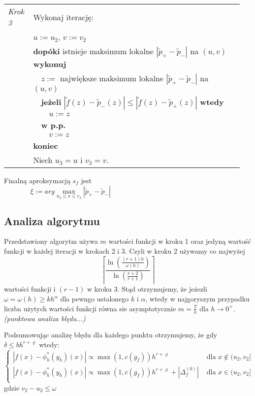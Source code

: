 \documentclass[oik, pdftex, robocza, man]{mgrwms}
\begin{document}
\begin{tabular}{p{0.10\linewidth} p{0.85\linewidth}}
    \textit{Krok 3} & Wykonaj iterację: \\
                    & $u := u_2$, $v := v_2$ \\
                    & \textbf{dopóki} istnieje maksimum lokalne $|\tilde{p}_{+} - \tilde{p}_{-}|$ na $(u,v)$ \textbf{wykonuj} \\
                    & $\quad$$z :=$ największe maksimum lokalne $|\tilde{p}_{+} - \tilde{p}_{-}|$ na $(u,v)$ \\
                    & $\quad$\textbf{jeżeli} $|\tilde{f}(z) - \tilde{p}_{-}(z)| \leq |\tilde{f}(z) - \tilde{p}_{+}(z)|$ \textbf{wtedy} \\
                    & $\quad\quad$$u:= z$ \\
                    & $\quad$\textbf{w p.p.} \\
                    & $\quad\quad$$v:= z$ \\
                    & \textbf{koniec} \\
                    & Niech $u_3 = u$ i $v_3 = v$.
\end{tabular} \vspace{10pt}

Finalną aproksymacją $s_f$ jest
\begin{equation*}
        \xi := arg \max_{u_3 \leq x \leq v_3}|\tilde{p}_{+} - \tilde{p}_{-}| \hspace{200pt}
\end{equation*}

\subsection{Analiza algorytmu}

Przedstawiony algorytm używa $m$ wartości funkcji w kroku 1 oraz jedyną wartość funkcji w każdej iteracji w krokach 2 i 3. Czyli w kroku 2 używamy co najwyżej
\begin{equation*}
    \left\lceil\frac{\ln \left(\frac{(r+1) h}{\omega(h)}\right)}{\ln \left(\frac{r+2}{r+1}\right)}\right\rceil
\end{equation*}
wartości funkcji i $(r-1)$ w kroku 3.
Stąd otrzymujemy, że jeżezli $\omega = \omega(h) \geq kh^{\alpha}$ dla pewngo ustalonego $k$ i $\alpha$, wtedy w najgoryszym przypadku liczba użytych wartości funkcji równa sie asymptotycznie $m = \frac{T}{h}$ dla $h \rightarrow 0^{+}$. \\


\textit{(punktowa analiza błędu...)}


Podsumowując analizę błędu dla każdego punktu otrzymujemy, że gdy $\delta \leq bh^{r+\varrho}$ wtedy:
\begin{equation*}
    \begin{cases}
        |f(x) - \phi_{h}^{*}(y_{h})(x)| \propto \max(1, c(g_{f})) h^{r+\varrho} & \text{ dla } x \notin (u_{2}, v_{2}] \\
        |f(x) - \phi_{h}^{*}(y_{h})(x)| \propto \max(1, c(g_{f})) h^{r+\varrho} + |\Delta_{f}^{(0)}| & \text{ dla } x \in (u_{2}, v_{2}] \\
    \end{cases}
\end{equation*}
gdzie $v_{2} - u_{2} \leq \omega$
\end{document}
